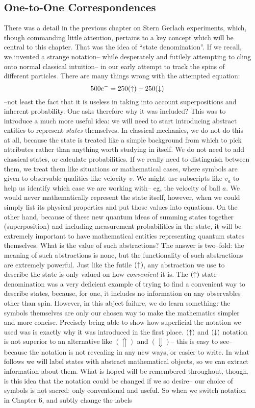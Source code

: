 \subsection{One-to-One Correspondences}
There was a detail in the previous chapter on Stern Gerlach experiments, which, though commanding little attention, pertains to a key concept which will be central to this chapter. That was the idea of ``state denomination''. If we recall, we invented a strange notation-- while desperately and futilely attempting to cling onto normal classical intuition--  in our early attempt to track the spins of different particles. There are many things wrong with the attempted equation:
$$
500e^{-}=250(\uparrow) + 250(\downarrow)
$$
--not least the fact that it is useless in taking into account superpositions and inherent probability. One asks therefore why it was included? This was to introduce a much more useful idea: we will need to start introducing abstract entities to represent \textit{states} themselves. In classical mechanics, we do not do this at all, because the state is treated like a simple background from which to pick attributes rather than anything worth studying in itself. We do not need to add classical states, or calculate probabilities. If we really need to distinguish between them, we treat them like situations or mathematical cases, where symbols are given to observable qualities like velocity $v$. We might use subscripts like $v_{a}$ to help us identify which case we are working with-- eg, the velocity of ball $a$. We would never mathematically represent the state itself, however, when we could simply list its physical properties and put those values into equations. On the other hand, because of these new quantum ideas of summing states together (superposition) and including measurement probabilities in the state, it will be extremely important to have mathematical entities representing quantum states themselves. What is the value of such abstractions? The answer is two--fold: the meaning of such abstractions is none, but the functionality of such abstractions are extremely powerful. Just like the futile $(\uparrow)$, any abstraction we use to describe the state is only valued on how \textit{convenient} it is. The $(\uparrow)$ state denomination was a very deficient example of trying to find a convenient way to describe states, because, for one, it includes no information on any observables other than spin. However, in this abject failure, we do learn something: the symbols themselves are only our chosen way to make the mathematics simpler and more concise. Precisely being able to show how superficial the notation we used was is exactly why it was introduced in the first place. $(\uparrow)$ and $(\downarrow)$ notation is not superior to an alternative like $(\Uparrow)$ and $(\Downarrow)$-- this is easy to see-- because the notation is not revealing in any new ways, or easier to write. In what follows we will label states with abstract mathematical objects, so we can extract information about them. What is hoped will be remembered throughout, though, is this idea that the notation could be changed if we so desire-- our choice of symbols is not sacred: only conventional and useful. So when we switch notation in Chapter 6, and subtly change the labels 